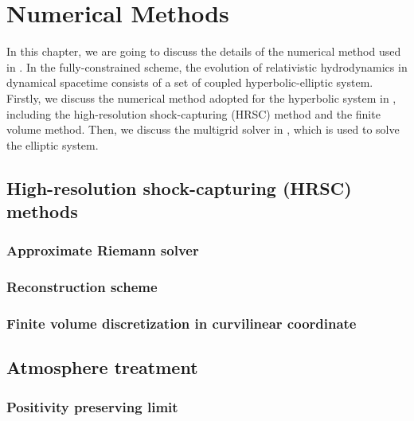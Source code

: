 
\chapter{Numerical Methods}  %

\ifpdf
    \graphicspath{{Chapter3/Figs/PDF/}{Chapter3/Figs/}}
\else
    \graphicspath{{Chapter3/Figs/}}
\fi

In this chapter, we are going to discuss the details of the numerical method used in .
In the fully-constrained scheme, the evolution of relativistic hydrodynamics in dynamical spacetime
consists of a set of coupled hyperbolic-elliptic system.
Firstly, we discuss the numerical method adopted for the hyperbolic system in ,
including the high-resolution shock-capturing (HRSC) method and the finite volume method.
Then, we discuss the multigrid solver in ,
which is used to solve the elliptic system.

\section{High-resolution shock-capturing (HRSC) methods}
\subsection{Approximate Riemann solver}
\subsection{Reconstruction scheme}
\subsection{Finite volume discretization in curvilinear coordinate}

\section{Atmosphere treatment}
\subsection{Positivity preserving limit}

